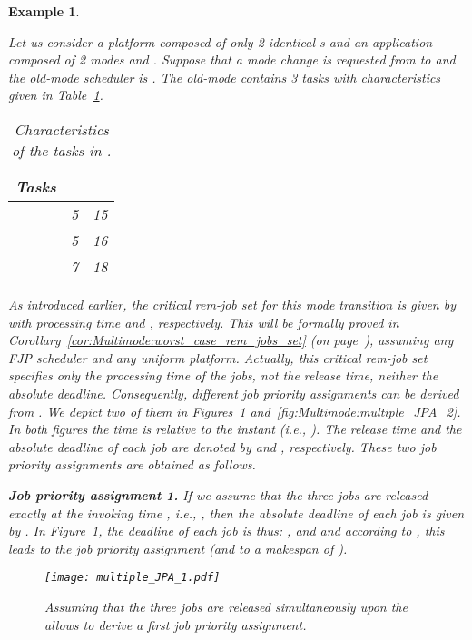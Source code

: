 \documentclass{article}
\newtheorem{validity test}{Validity Test}
\newtheorem{Example}{Example}
\begin{document}
\begin{Example}
\label{lem:Multimode:FJP_priority_assignment_not_unique}

Let us consider a platform  composed of only 2 \emph{identical} s and an application  composed of 2 modes  and . Suppose that a mode change is requested from  to  and the old-mode scheduler  is . The old-mode  contains 3 tasks with characteristics given in Table~\ref{tab:priority_example1}.

\begin{table}[h!]
\centering
\begin{tabular}{| c | c | c |}
\hline
Tasks &  &   \\
\hline
 & 5 & 15 \\
\hline
 & 5 & 16 \\
\hline
 & 7 & 18 \\
\hline
\end{tabular}
\caption{Characteristics of the tasks in .}
\label{tab:priority_example1}
\end{table}

As introduced earlier, the critical rem-job set for this mode transition is given by  with processing time  and , respectively. This will be formally proved in Corollary~\ref{cor:Multimode:worst_case_rem_jobs_set} (on page~\pageref{cor:Multimode:worst_case_rem_jobs_set}), assuming any FJP scheduler and any uniform platform. Actually, this critical rem-job set specifies \emph{only} the processing time of the jobs, \emph{not} the release time, neither the absolute deadline. Consequently, different job priority assignments can be derived from . We depict two of them in Figures~\ref{fig:Multimode:multiple_JPA_1} and~\ref{fig:Multimode:multiple_JPA_2}. In both figures the time is relative to the instant  (i.e., ). The release time and the absolute deadline of each job  are denoted by  and , respectively. These two job priority assignments are obtained as follows.

\noindent \textbf{Job priority assignment 1.} If we assume that the three jobs are released \emph{exactly} at the  invoking time , i.e., , then the absolute deadline of each job  is given by . In Figure~\ref{fig:Multimode:multiple_JPA_1}, the deadline of each job is thus: ,  and  and according to , this leads to the job priority assignment  (and to a makespan of ).  

\begin{figure}[h]
\begin{center}
\texttt{[image: multiple\_JPA\_1.pdf]}
\caption{Assuming that the three jobs are released simultaneously upon the  allows to derive a first job priority assignment.}
\label{fig:Multimode:multiple_JPA_1}
\end{center}
\end{figure}


\end{Example}
\end{document}
